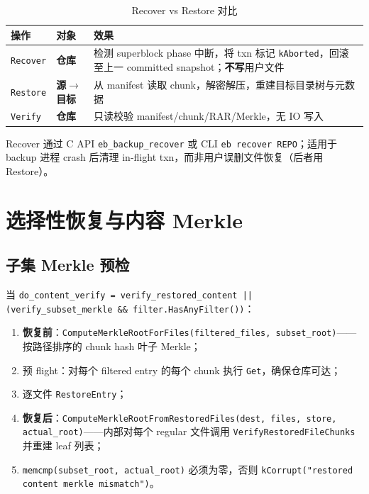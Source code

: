 \begin{table}[htbp]
\centering
\caption{Recover vs Restore 对比}
\begin{tabular}{@{}llp{6.8cm}@{}}
\toprule
操作 & 对象 & 效果 \\
\midrule
\texttt{Recover} & \textbf{仓库} & 检测 superblock phase 中断，将 txn 标记 \texttt{kAborted}，回滚至上一 committed snapshot；\textbf{不写}用户文件 \\
\texttt{Restore} & \textbf{源$\rightarrow$目标} & 从 manifest 读取 chunk，解密解压，重建目标目录树与元数据 \\
\texttt{Verify} & \textbf{仓库} & 只读校验 manifest/chunk/RAR/Merkle，无 IO 写入 \\
\bottomrule
\end{tabular}
\end{table}

Recover 通过 C API \texttt{eb\_backup\_recover} 或 CLI \texttt{eb recover REPO}；适用于 backup 进程 crash 后清理 in-flight txn，而非用户误删文件恢复（后者用 Restore）。

\section{选择性恢复与内容 Merkle}

\subsection{子集 Merkle 预检}

当 \texttt{do\_content\_verify = verify\_restored\_content || (verify\_subset\_merkle \&\& filter.HasAnyFilter())}：

\begin{enumerate}
  \item \textbf{恢复前}：\texttt{ComputeMerkleRootForFiles(filtered\_files, subset\_root)}——按路径排序的 chunk hash 叶子 Merkle；
  \item 预 flight：对每个 filtered entry 的每个 chunk 执行 \texttt{Get}，确保仓库可达；
  \item 逐文件 \texttt{RestoreEntry}；
  \item \textbf{恢复后}：\texttt{ComputeMerkleRootFromRestoredFiles(dest, files, store, actual\_root)}——内部对每个 regular 文件调用 \texttt{VerifyRestoredFileChunks} 并重建 leaf 列表；
  \item \texttt{memcmp(subset\_root, actual\_root)} 必须为零，否则 \texttt{kCorrupt("restored content merkle mismatch")}。
\end{enumerate}

